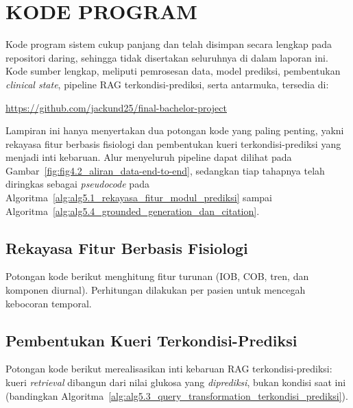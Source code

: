 \cleardoublepage
\chapter{KODE PROGRAM}

Kode program sistem cukup panjang dan telah disimpan secara lengkap pada repositori daring, sehingga tidak disertakan seluruhnya di dalam laporan ini. Kode sumber lengkap, meliputi pemrosesan data, model prediksi, pembentukan \textit{clinical state}, pipeline RAG terkondisi-prediksi, serta antarmuka, tersedia di:
\begin{center}
\url{https://github.com/jackund25/final-bachelor-project}
\end{center}

Lampiran ini hanya menyertakan dua potongan kode yang paling penting, yakni rekayasa fitur berbasis fisiologi dan pembentukan kueri terkondisi-prediksi yang menjadi inti kebaruan. Alur menyeluruh pipeline dapat dilihat pada Gambar~\ref{fig:fig4.2_aliran_data-end-to-end}, sedangkan tiap tahapnya telah diringkas sebagai \textit{pseudocode} pada Algoritma~\ref{alg:alg5.1_rekayasa_fitur_modul_prediksi} sampai Algoritma~\ref{alg:alg5.4_grounded_generation_dan_citation}.

\section{Rekayasa Fitur Berbasis Fisiologi}
Potongan kode berikut menghitung fitur turunan (IOB, COB, tren, dan komponen diurnal). Perhitungan dilakukan per pasien untuk mencegah kebocoran temporal.


\section{Pembentukan Kueri Terkondisi-Prediksi}
Potongan kode berikut merealisasikan inti kebaruan RAG terkondisi-prediksi: kueri \textit{retrieval} dibangun dari nilai glukosa yang \emph{diprediksi}, bukan kondisi saat ini (bandingkan Algoritma~\ref{alg:alg5.3_query_transformation_terkondisi_prediksi}).

